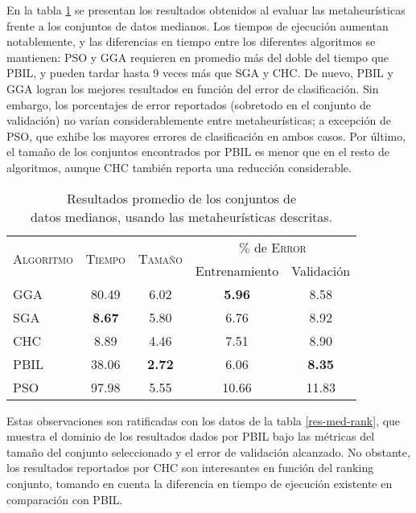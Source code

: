 En la tabla \ref{res-med} se presentan los resultados obtenidos al evaluar las metaheurísticas frente a los conjuntos de datos medianos. Los tiempos de ejecución aumentan notablemente, y las diferencias en tiempo entre los diferentes algoritmos se mantienen: PSO y GGA requieren en promedio más del doble del tiempo que PBIL, y pueden tardar hasta 9 veces más que SGA y CHC. De nuevo, PBIL y GGA logran los mejores resultados en función del error de clasificación. Sin embargo, los porcentajes de error reportados (sobretodo en el conjunto de validación) no varían considerablemente entre metaheurísticas; a excepción de PSO, que exhibe los mayores errores de clasificación en ambos casos. Por último, el tamaño de los conjuntos encontrados por PBIL es menor que en el resto de algoritmos, aunque CHC también reporta una reducción considerable.

\begin{table}[h!]
\centering
\begin{tabular}{l c c c c}
\hline
\multirow{2}{*}{\textsc{Algoritmo}}
	& \multirow{2}{*}{\textsc{Tiempo}}
	& \multirow{2}{*}{\textsc{Tamaño}}
	& \multicolumn{2}{c}{$\%$ de \textsc{Error}} \\\cline{4-5}
 & & & \scriptsize{Entrenamiento} & \scriptsize{Validación} \\
\hline
\hline
GGA  & 80.49 & 6.02 &  \textbf{5.96} &  8.58 \\
SGA  & \textbf{8.67} & 5.80 &  6.76 &  8.92 \\
CHC  &  8.89 & 4.46 &  7.51 &  8.90 \\
PBIL & 38.06 & \textbf{2.72} &  6.06 &  \textbf{8.35} \\
PSO  & 97.98 & 5.55 & 10.66 & 11.83 \\
\hline
\end{tabular}
\caption[Resultados de metaheurísticas usando conjuntos de datos medianos]{Resultados promedio de los conjuntos de\\datos medianos, usando las metaheurísticas descritas.}
\label{res-med}
\end{table}

Estas observaciones son ratificadas con los datos de la tabla \ref{res-med-rank}, que muestra el dominio de los resultados dados por PBIL bajo las métricas del tamaño del conjunto seleccionado y el error de validación alcanzado. No obstante, los resultados reportados por CHC son interesantes en función del ranking conjunto, tomando en cuenta la diferencia en tiempo de ejecución existente en comparación con PBIL.

